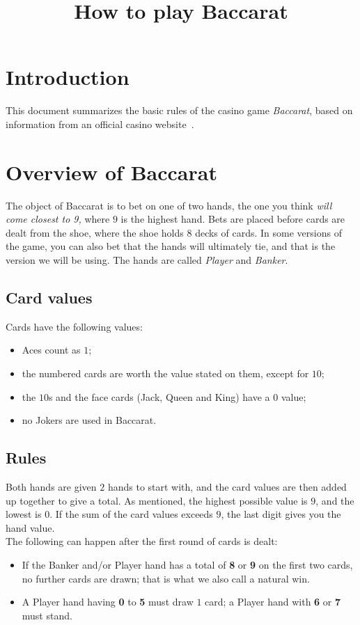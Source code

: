 \documentclass[12pt]{article}
\title{How to play Baccarat}
\author{}
\date{}
\begin{document}
\maketitle

\section{Introduction}
This document summarizes the basic rules of the casino game \textit{Baccarat}, based on information from an official casino website~\cite{venetianBaccarat}.

\section{Overview of Baccarat}
The object of Baccarat is to bet on one of two hands, the one you think \textit{will come closest to 9,} where $9$ is the highest hand. Bets are placed before cards are dealt from the shoe, where the shoe holds $8$ decks of cards. In some versions of the game, you can also bet that the hands will ultimately tie, and that is the version we will be using. The hands are called \textit{Player} and \textit{Banker}.

\subsection*{Card values}
Cards have the following values:
\begin{itemize}
    \item Aces count as $1$;
    \item the numbered cards are worth the value stated on them, except for $10$;
    \item the $10$s and the face cards (Jack, Queen and King) have a $0$ value;
    \item no Jokers are used in Baccarat.
\end{itemize}

\subsection*{Rules}
Both hands are given $2$ hands to start with, and the card values are then added up together to give a total. As mentioned, the highest possible value is $9$, and the lowest is $0$. If the sum of the card values exceeds $9$, the last digit gives you the hand value. \\

\noindent The following can happen after the first round of cards is dealt:
\begin{itemize}
    \item If the Banker and/or Player hand has a total of \textbf{8} or \textbf{9} on the first two cards, no further cards are drawn; that is what we also call a natural win.
    \item A Player hand having \textbf{0} to \textbf{5} must draw $1$ card; a Player hand with \textbf{6} or \textbf{7} must stand.
\end{itemize}
\end{document}

